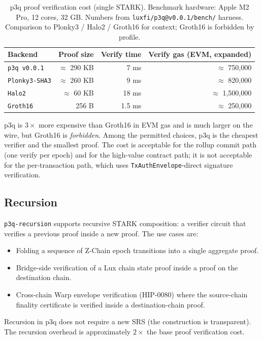 \begin{table}[H]
\centering
\caption{p3q proof verification cost (single STARK). Benchmark hardware:
Apple M2 Pro, 12 cores, 32 GB. Numbers from
\texttt{luxfi/p3q@v0.0.1/bench/} harness. Comparison to Plonky3 / Halo2 /
Groth16 for context; Groth16 is forbidden by profile.}
\label{tab:p3q-bench}
\begin{tabular}{lrrr}
\toprule
Backend & Proof size & Verify time & Verify gas (EVM, expanded) \\
\midrule
\texttt{p3q v0.0.1}      & $\approx$ 290 KB & 7 ms  & $\approx$ 750{,}000 \\
\texttt{Plonky3-SHA3}    & $\approx$ 260 KB & 9 ms  & $\approx$ 820{,}000 \\
\texttt{Halo2}           & $\approx$  60 KB & 18 ms & $\approx$ 1{,}500{,}000 \\
\texttt{Groth16}         & 256 B            & 1.5 ms & $\approx$ 250{,}000 \\
\bottomrule
\end{tabular}
\end{table}

p3q is $3\times$ more expensive than Groth16 in EVM gas and is much larger
on the wire, but Groth16 is \emph{forbidden}. Among the permitted choices,
p3q is the cheapest verifier and the smallest proof. The cost is
acceptable for the rollup commit path (one verify per epoch) and for the
high-value contract path; it is not acceptable for the per-transaction
path, which uses \texttt{TxAuthEnvelope}-direct signature verification.

\subsection{Recursion}

\texttt{p3q-recursion} supports recursive STARK composition: a verifier
circuit that verifies a previous proof inside a new proof. The use cases
are:

\begin{itemize}[leftmargin=2em,nosep]
  \item Folding a sequence of Z-Chain epoch transitions into a single
    aggregate proof.
  \item Bridge-side verification of a Lux chain state proof inside a
    proof on the destination chain.
  \item Cross-chain Warp envelope verification (HIP-0080) where the
    source-chain finality certificate is verified inside a destination-chain
    proof.
\end{itemize}

Recursion in p3q does not require a new SRS (the construction is
transparent). The recursion overhead is approximately $2\times$ the base
proof verification cost.
